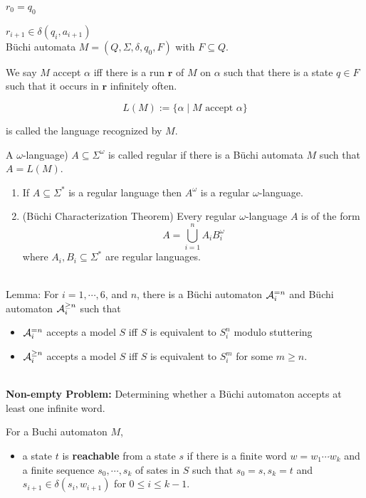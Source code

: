\documentclass[12pt]{article}
\begin{document}
\begin{CJK*}{GBK}{song}
$r_0=q_0$

$r_{i+1}\in \delta(q_i,a_{i+1})$
\ \\


B\"{u}chi automata $M=(Q,\Sigma,\delta, q_0, F)$ with $F\subseteq Q$.

We say $M$ accept $\alpha$  iff there is a run $\mathbf{r}$ of $M$ on $\alpha$ such that there is a state $q\in F$ such that it occurs in $\mathbf{r}$ infinitely often.

$$L(M):=\{\alpha\mid M \mbox{ accept } \alpha\}$$

is called the language recognized by $M$.

A $\omega$-language) $A\subseteq \Sigma^{\omega}$ is called regular if there is a B\"{u}chi automata $M$ such that $A=L(M)$.



\begin{enumerate}
\item If $A\subseteq\Sigma^*$ is a regular language then $A^{\omega}$ is a regular $\omega$-language.

\item (B\"{u}chi Characterization Theorem) Every regular $\omega$-language $A$ is of the form $$A=\bigcup_{i=1}^nA_iB_i^{\omega}$$
where $A_i, B_i\subseteq \Sigma^*$ are regular languages.
\end{enumerate}
\ \\

Lemma: For $i=1,\cdots,6$, and $n$, there is a B\"{u}chi automaton ${\cal A}_i^{=n}$ and B\"{u}chi automaton ${\cal A}^{\geq n}_i$ such that
\begin{itemize}
\item ${\cal A}_i^{=n}$ accepts a model $S$ iff $S$ is equivalent to $S^n_i$ modulo stuttering
\item ${\cal A}^{\geq n}_i$ accepts a model $S$ iff $S$ is equivalent to $S^m_i$ for some $m\geq n$.
\end{itemize}
\ \\

{\bf Non-empty Problem:} Determining whether a B\"{u}chi automaton accepts at least one infinite word.

For a Buchi automaton $M$,
\begin{itemize}
\item a state $t$ is {\bf reachable} from a state $s$ if there is a finite word $w=w_1\cdots w_k$ and a finite sequence $s_0,\cdots, s_k$ of sates in $S$ such that $s_0=s, s_k=t$ and $s_{i+1}\in \delta(s_i,w_{i+1})$ for $0\leq i\leq k-1$.


\end{itemize}
\end{CJK*}
\end{document}
